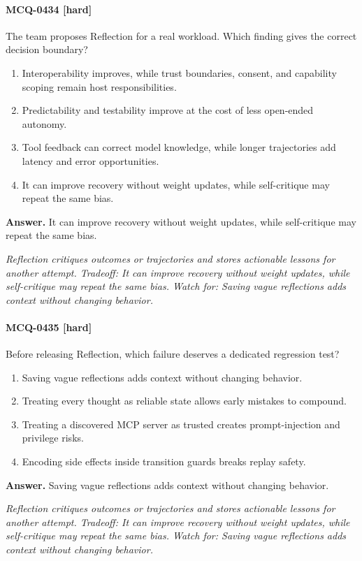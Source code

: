 \paragraph{MCQ-0434 [hard]} The team proposes Reflection for a real workload. Which finding gives the correct decision boundary?
\begin{enumerate}[label=\Alph*.]
\item Interoperability improves, while trust boundaries, consent, and capability scoping remain host responsibilities.
\item Predictability and testability improve at the cost of less open-ended autonomy.
\item Tool feedback can correct model knowledge, while longer trajectories add latency and error opportunities.
\item It can improve recovery without weight updates, while self-critique may repeat the same bias.
\end{enumerate}
\noindent\textbf{Answer.} It can improve recovery without weight updates, while self-critique may repeat the same bias.
\par\textit{Reflection critiques outcomes or trajectories and stores actionable lessons for another attempt. Tradeoff: It can improve recovery without weight updates, while self-critique may repeat the same bias. Watch for: Saving vague reflections adds context without changing behavior.}
\paragraph{MCQ-0435 [hard]} Before releasing Reflection, which failure deserves a dedicated regression test?
\begin{enumerate}[label=\Alph*.]
\item Saving vague reflections adds context without changing behavior.
\item Treating every thought as reliable state allows early mistakes to compound.
\item Treating a discovered MCP server as trusted creates prompt-injection and privilege risks.
\item Encoding side effects inside transition guards breaks replay safety.
\end{enumerate}
\noindent\textbf{Answer.} Saving vague reflections adds context without changing behavior.
\par\textit{Reflection critiques outcomes or trajectories and stores actionable lessons for another attempt. Tradeoff: It can improve recovery without weight updates, while self-critique may repeat the same bias. Watch for: Saving vague reflections adds context without changing behavior.}
